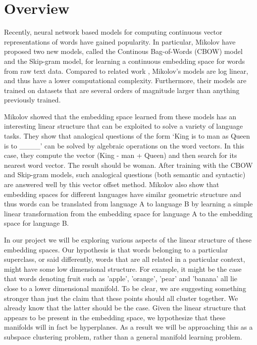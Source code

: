 \section{Overview}\label{sec:overview}

Recently, neural network based models for computing continuous vector representations of words have gained popularity. 
In particular, Mikolov \etal \cite{mikolov1, mikolov2} have proposed two new models, called the Continous Bag-of-Words (CBOW) model and the Skip-gram model, for learning a continuous embedding space for words from raw text data. 
Compared to related work \cite{bengio,mikolov5}, Mikolov’s models are log linear, and thus have a lower computational complexity. 
Furthermore, their models are trained on datasets that are several orders of magnitude larger than anything previously trained.
 
Mikolov \etal \cite{mikolov3} showed that the embedding space learned from these models has an interesting linear structure that can be exploited to solve a variety of language tasks. 
They show that analogical questions of the form `King is to man as Queen is to \_\_\_\_' can be solved by algebraic operations on the word vectors. 
In this case, they compute the vector (King - man + Queen) and then search for its nearest word vector. 
The result should be woman. 
After training with the CBOW and Skip-gram models, such analogical questions (both semantic and syntactic) are answered well by this vector offset method. 
Mikolov \etal \cite{mikolov4} also show that embedding spaces for different languages  have similar geometric structure and thus words can be translated from language A to language B by learning a simple linear transformation from the embedding space for language A to the embedding space for language B.
 
In our project we will be exploring various aspects of the linear structure of these embedding spaces. 
Our hypothesis is that words belonging to a particular superclass, or said differently, words that are all related in a particular context, might have some low dimensional structure. 
For example, it might be the case that words denoting fruit such as 'apple', 'orange', 'pear' and 'banana' all lie close to a lower dimensional manifold. 
To be clear, we are suggesting something stronger than just the claim that these points should all cluster together. 
We already know that the latter should be the case. 
Given the linear structure that appears to be present in the embedding space, we hypothesize that these manifolds will in fact be hyperplanes. 
As a result we will be approaching this as a subspace clustering problem, rather than a general manifold learning problem.
